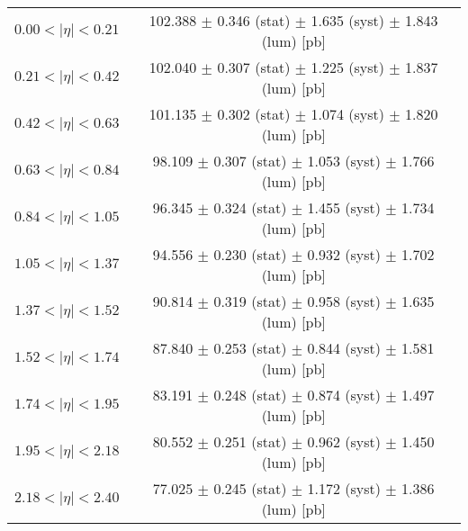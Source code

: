 \begin{tabular}{lc}
\hline
$0.00 < |\eta| <0.21$          & 102.388 $\pm$ 0.346 (stat) $\pm$ 1.635 (syst) $\pm$ 1.843 (lum) [pb]  \\
$0.21 < |\eta| <0.42$          & 102.040 $\pm$ 0.307 (stat) $\pm$ 1.225 (syst) $\pm$ 1.837 (lum) [pb]  \\
$0.42 < |\eta| <0.63$          & 101.135 $\pm$ 0.302 (stat) $\pm$ 1.074 (syst) $\pm$ 1.820 (lum) [pb]  \\
$0.63 < |\eta| <0.84$          & 98.109 $\pm$ 0.307 (stat) $\pm$ 1.053 (syst) $\pm$ 1.766 (lum) [pb]  \\
$0.84 < |\eta| <1.05$          & 96.345 $\pm$ 0.324 (stat) $\pm$ 1.455 (syst) $\pm$ 1.734 (lum) [pb]  \\
$1.05 < |\eta| <1.37$          & 94.556 $\pm$ 0.230 (stat) $\pm$ 0.932 (syst) $\pm$ 1.702 (lum) [pb]  \\
$1.37 < |\eta| <1.52$          & 90.814 $\pm$ 0.319 (stat) $\pm$ 0.958 (syst) $\pm$ 1.635 (lum) [pb]  \\
$1.52 < |\eta| <1.74$          & 87.840 $\pm$ 0.253 (stat) $\pm$ 0.844 (syst) $\pm$ 1.581 (lum) [pb]  \\
$1.74 < |\eta| <1.95$          & 83.191 $\pm$ 0.248 (stat) $\pm$ 0.874 (syst) $\pm$ 1.497 (lum) [pb]  \\
$1.95 < |\eta| <2.18$          & 80.552 $\pm$ 0.251 (stat) $\pm$ 0.962 (syst) $\pm$ 1.450 (lum) [pb]  \\
$2.18 < |\eta| <2.40$          & 77.025 $\pm$ 0.245 (stat) $\pm$ 1.172 (syst) $\pm$ 1.386 (lum) [pb]  \\
\hline
\end{tabular}
